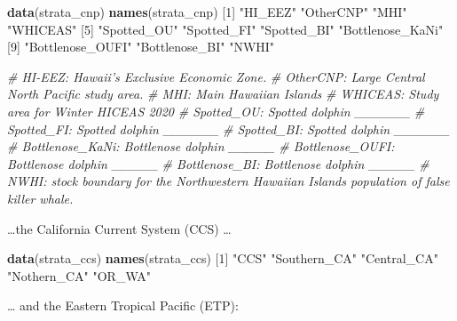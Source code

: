 \documentclass[
]{book}
\newenvironment{Shaded}{\begin{snugshade}}{\end{snugshade}}
\newcommand{\CommentTok}[1]{\textcolor[rgb]{0.56,0.35,0.01}{\textit{#1}}}
\newcommand{\DecValTok}[1]{\textcolor[rgb]{0.00,0.00,0.81}{#1}}
\newcommand{\KeywordTok}[1]{\textcolor[rgb]{0.13,0.29,0.53}{\textbf{#1}}}
\newcommand{\NormalTok}[1]{#1}
\newcommand{\StringTok}[1]{\textcolor[rgb]{0.31,0.60,0.02}{#1}}
\begin{document}
\begin{Shaded}
\begin{Highlighting}[]
\KeywordTok{data}\NormalTok{(strata_cnp) }
\KeywordTok{names}\NormalTok{(strata_cnp)}
\NormalTok{ [}\DecValTok{1}\NormalTok{] }\StringTok{"HI_EEZ"}          \StringTok{"OtherCNP"}        \StringTok{"MHI"}             \StringTok{"WHICEAS"}        
\NormalTok{ [}\DecValTok{5}\NormalTok{] }\StringTok{"Spotted_OU"}      \StringTok{"Spotted_FI"}      \StringTok{"Spotted_BI"}      \StringTok{"Bottlenose_KaNi"}
\NormalTok{ [}\DecValTok{9}\NormalTok{] }\StringTok{"Bottlenose_OUFI"} \StringTok{"Bottlenose_BI"}   \StringTok{"NWHI"}           

\CommentTok{# HI-EEZ: Hawaii's Exclusive Economic Zone.}
\CommentTok{# OtherCNP: Large Central North Pacific study area.}
\CommentTok{# MHI: Main Hawaiian Islands}
\CommentTok{# WHICEAS: Study area for Winter HICEAS 2020}
\CommentTok{# Spotted_OU: Spotted dolphin ______}
\CommentTok{# Spotted_FI: Spotted dolphin ______}
\CommentTok{# Spotted_BI: Spotted dolphin ______}
\CommentTok{# Bottlenose_KaNi: Bottlenose dolphin _____}
\CommentTok{# Bottlenose_OUFI: Bottlenose dolphin _____}
\CommentTok{# Bottlenose_BI: Bottlenose dolphin _____}
\CommentTok{# NWHI: stock boundary for the Northwestern Hawaiian Islands population of false killer whale. }
\end{Highlighting}
\end{Shaded}

\ldots the California Current System (CCS) \ldots{}

\begin{Shaded}
\begin{Highlighting}[]
\KeywordTok{data}\NormalTok{(strata_ccs) }
\KeywordTok{names}\NormalTok{(strata_ccs)}
\NormalTok{[}\DecValTok{1}\NormalTok{] }\StringTok{"CCS"}         \StringTok{"Southern_CA"} \StringTok{"Central_CA"}  \StringTok{"Nothern_CA"}  \StringTok{"OR_WA"}      
\end{Highlighting}
\end{Shaded}

\ldots{} and the Eastern Tropical Pacific (ETP):
\end{document}

